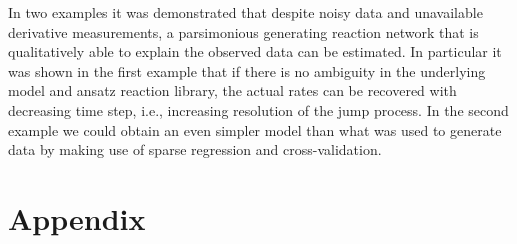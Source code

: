\documentclass[oneside, abstracton, titlepage]{scrartcl}
\begin{document}
	In two examples it was demonstrated that despite noisy data and unavailable derivative measurements, a parsimonious generating reaction network that is qualitatively able to explain the observed data can be estimated.
	In particular it was shown in the first example that if there is no ambiguity in the underlying model and ansatz reaction library, the actual rates can be recovered with decreasing time step, i.e., increasing resolution of the jump process.
	In the second example we could obtain an even simpler model than what was used to generate data by making use of sparse regression and cross-validation.

	\newpage
% 	
	
	
	\newpage	
	\section{Appendix}\label{sec:appendix}
\end{document}

